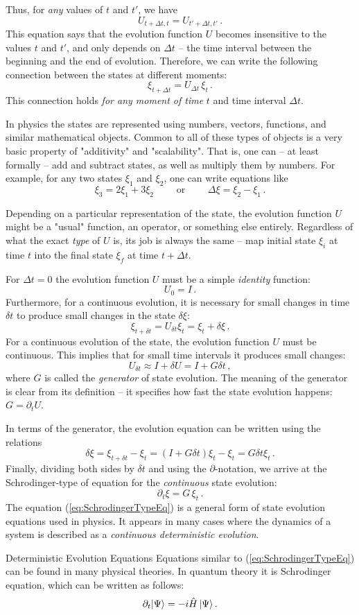 Thus, for \emph{any} values of $t$ and $t'$, we have
\[
U_{t+\Delta t, t}  = U_{t'+\Delta t, t'}\,.
\]
This equation says that the evolution function $U$ becomes insensitive to the values $t$ and $t'$, and only depends on $\Delta t$ -- the time interval between the beginning and the end of evolution. Therefore, we can write the following connection between the states at different moments:
\[
\xi_{t+\Delta t} = U_{\Delta t}\,\xi_t\,.
\]
This connection holds \emph{for any moment of time} $t$ and time interval $\Delta t$.

In physics the states are represented using numbers, vectors, functions, and similar mathematical objects. Common to all of these types of objects is a very basic property of "additivity" and "scalability". That is, one can -- at least formally -- add and subtract states, as well as multiply them by numbers. For example, for any two states $\xi_1$ and $\xi_2$, one can write  equations like
\[
\xi_3 = 2\xi_1 + 3\xi_2\qquad\textrm{ or }\qquad \Delta \xi = \xi_2 - \xi_1\,.
\]

Depending on a particular representation of the state, the evolution function $U$ might be a "usual" function, an operator, or something else entirely. Regardless of what the exact \emph{type} of $U$ is, its job is always the same -- map initial state $\xi_i$ at time $t$ into the final state $\xi_f$ at time $t+\Delta t$.
 
For $\Delta t = 0$ the evolution function $U$ must be a simple \emph{identity} function:
\[
U_0 = I\,.
\]
Furthermore, for a continuous evolution, it is necessary for small changes in time $\delta t$ to produce small changes in the state $\delta \xi$:
\[
\xi_{t+\delta t} = U_{\delta t} \xi_t = \xi_t + \delta \xi\,.
\] 
For a continuous evolution of the state, the evolution function $U$ must be continuous. This implies that for small time intervals it produces small changes:
\[
U_{\delta t} \approx I + \delta U = I + G\delta t\,,
\]
where $G$ is called the \emph{generator} of state evolution. The meaning of the generator is clear from its definition -- it specifies how fast the state evolution happens: $G=\partial_t U$.

In terms of the generator, the evolution equation can be written using the relations 
\[
\delta \xi = \xi_{t+\delta t} - \xi_t = \left(I + G\delta t\right)\xi_t - \xi_t = G\delta t\xi_t\,.
\]
Finally, dividing both sides by $\delta t$ and using the $\partial$-notation, we arrive at the Schrodinger-type of equation for the \emph{continuous} state evolution:
\begin{equation}
	\partial_t \xi = G\,\xi_t\,.
	\label{eq:SchrodingerTypeEq}
\end{equation}
The equation (\ref{eq:SchrodingerTypeEq}) is a general form of state evolution equations used in physics. It appears in many cases where the dynamics of a system is described as a \emph{continuous deterministic evolution}. 
\begin{mybio}{Deterministic Evolution Equations}
	Equations similar to (\ref{eq:SchrodingerTypeEq}) can be found in many physical theories. In quantum theory it is Schrodinger equation, which can be written as follows:
	\[
	\partial_t|{\Psi}\rangle = -i\hat{H}\,|{\Psi}\rangle\,.
	\]
\end{mybio}


